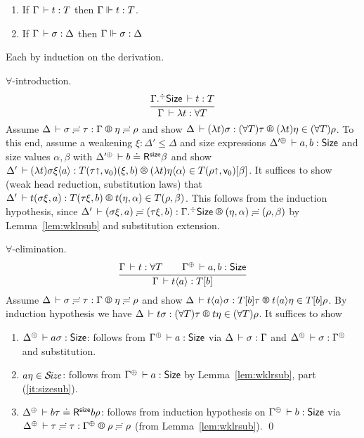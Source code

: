 \documentclass[acmlarge,review,anonymous]{acmart}\settopmatter{printfolios=true}
\makeatletter
\newenvironment{proof*}[1][\proofname]{\par
  \normalfont \topsep6\p@\@plus6\p@\relax
  \trivlist
  \item[\@proofindent\hskip\labelsep
        {\@proofnamefont #1\@addpunct{.}}]\ignorespaces
}{%
  \endtrivlist\@endpefalse
}
\makeatother
\begin{document}
\begin{theorem}
\label{thm:fundty}
\bla
\begin{enumerate}
\item
If\/ $\Gamma \,\vdash t : T$ then $\Gamma \Vdash t : T$.
\item
If\/ $\Gamma \,\vdash \sigma : \Delta$ then
$\Gamma \Vdash \sigma : \Delta$
\end{enumerate}
\end{theorem}
\begin{proof*}
Each by induction on the derivation.

\begin{caselist}

\nextcase $\forall$-introduction.
\[
  \ru{\erext \Gamma \Size \der t : T
    }{\Gamma \der \lambda t : \forall T}
\]
Assume $\LRSub {\Delta} {\sigma} {\tau} \Gamma {\eta} {\rho}$ and show
$\LR \Delta {(\lambda t)\sigma} {(\forall T)\tau} {(\lambda t)\eta} {(\forall T)\rho}$.
To this end, assume a weakening $\xi : \Delta' \leq \Delta$ and
size expressions %
$\resurrect{\Delta'} \der a, b : \Size$ and size values $\alpha,\beta$ with
$\LRSize {\resurrect{\Delta'}} b \beta$ and show
$\LR {\Delta'} {(\lambda t)\sigma\xi \ann a} {T(\tau \slift, \ind 0)(\xi,b)} {(\lambda t)\eta \ann \alpha} {T(\rho\slift, \ind 0)[\beta]}$.
It suffices to show (weak head reduction, substitution laws) that
$\LR {\Delta'} {t(\sigma\xi,a)} {T(\tau\xi,b)} {t(\eta,\alpha)} {T(\rho,\beta)}$.
This follows from the induction hypothesis, since
$\LRSub {\Delta'} {(\sigma\xi,a)} {(\tau\xi,b)} {\erext \Gamma \Size} {(\eta,\alpha)} {(\rho,\beta)}$
by Lemma~\ref{lem:wklrsub} and substitution extension.

\nextcase $\forall$-elimination.
\[
  \ru{\Gamma \der t : \forall T \qquad %
      \resurrect \Gamma \der a,b : \Size
    }{\Gamma \der t \ann a : T[b]}
\]
Assume $\LRSub {\Delta} {\sigma} {\tau} \Gamma {\eta} {\rho}$ and show
$\LR \Delta {t \ann a \sigma} {T[b]\tau} {t \ann a \eta} {T[b]\rho}$.
By induction hypothesis we have $\LR \Delta {t \sigma} {(\forall T)\tau} {t \eta} {(\forall T) \rho}$.
It suffices to show
\begin{enumerate}
\item $\resurrect\Delta \der a\sigma : \Size$: follows from $\resurrect\Gamma \der a : \Size$
  via $\Delta \,\vdash \sigma : \Gamma$ and $\resurrect\Delta \der \sigma : \resurrect\Gamma$
  and substitution.
\item $a\eta \in \mathcal{S}\!\mathit{ize}$: follows from $\resurrect\Gamma \der a : \Size$
  by Lemma~\ref{lem:wklrsub}, part (\ref{it:sizesub}).
\item $\LRSize {\resurrect \Delta} {b\tau} {b\rho}$: follows from induction hypothesis on $\resurrect \Gamma \der b : \Size$ via $\LRSub {\resurrect \Delta} \tau \tau {\resurrect\Gamma} \rho \rho$ (from Lemma~\ref{lem:wklrsub}).
\qed
\end{enumerate}
\end{caselist}
\end{proof*}
\end{document}
